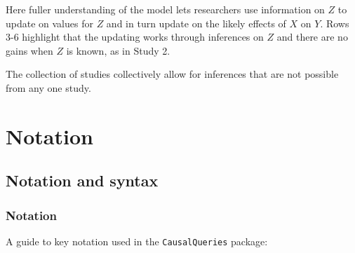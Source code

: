 \documentclass[
  12pt,
]{book}
\begin{document}
Here fuller understanding of the model lets researchers use information on \(Z\) to update on values for \(Z\) and in turn update on the likely effects of \(X\) on \(Y\). Rows 3-6 highlight that the updating works through inferences on \(Z\) and there are no gains when \(Z\) is known, as in Study 2.

The collection of studies collectively allow for inferences that are not possible from any one study.

\hypertarget{part-notation}{%
\part{Notation}\label{part-notation}}

\hypertarget{notation}{%
\chapter{Notation and syntax}\label{notation}}

\hypertarget{notation-1}{%
\section{Notation}\label{notation-1}}

A guide to key notation used in the \texttt{CausalQueries} package:
\end{document}
